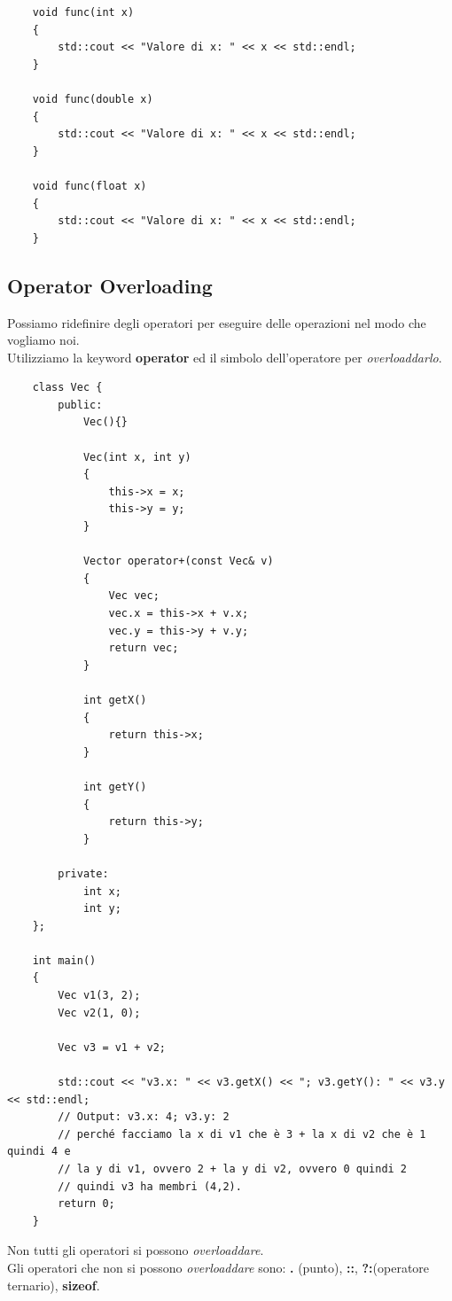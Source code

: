 \begin{lstlisting}
	void func(int x)
	{
		std::cout << "Valore di x: " << x << std::endl;
	}

	void func(double x)
	{
		std::cout << "Valore di x: " << x << std::endl;
	}

	void func(float x)
	{
		std::cout << "Valore di x: " << x << std::endl;
	}
\end{lstlisting}

\subsection{Operator Overloading}

\textsf{\small Possiamo ridefinire degli operatori per eseguire delle operazioni nel modo che vogliamo noi.} \\

\textsf{\small Utilizziamo la keyword \textbf{operator} ed il simbolo dell'operatore per \emph{overloaddarlo}.} \\

\begin{lstlisting}
	class Vec {
		public:
			Vec(){}
		
			Vec(int x, int y)
			{
				this->x = x;
				this->y = y;
			}
		
			Vector operator+(const Vec& v)
			{
				Vec vec;
				vec.x = this->x + v.x;
				vec.y = this->y + v.y;
				return vec;
			}
		
			int getX()
			{
				return this->x;
			}
		
			int getY()
			{
				return this->y;
			}
		
		private:
			int x;
			int y;
	};

	int main()
	{
		Vec v1(3, 2);
		Vec v2(1, 0);
		
		Vec v3 = v1 + v2;
		
		std::cout << "v3.x: " << v3.getX() << "; v3.getY(): " << v3.y << std::endl;
		// Output: v3.x: 4; v3.y: 2
		// perché facciamo la x di v1 che è 3 + la x di v2 che è 1 quindi 4 e 
		// la y di v1, ovvero 2 + la y di v2, ovvero 0 quindi 2
		// quindi v3 ha membri (4,2).
		return 0;
	}
\end{lstlisting}

\textsf{\small Non tutti gli operatori si possono \emph{overloaddare}.} \\

\textsf{\small Gli operatori che non si possono \emph{overloaddare} sono: \textbf{.} (punto), \textbf{::}, \textbf{?:}(operatore ternario), \textbf{sizeof}.} \\

